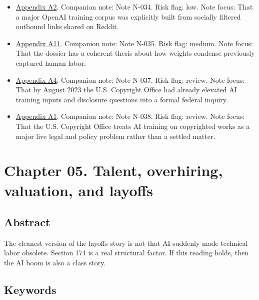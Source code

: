 \documentclass[
  american,
  11pt,
  letterpaper,
]{article}
\begin{document}
\begin{itemize}
  enough to survive dismissal.
\item
  \hyperref[ch-04-appendix-a2-language-models-are-unsupervised-multitask-learners]{Appendix
  A2}. Companion note: Note N-034. Risk flag: low. Note focus: That a
  major OpenAI training corpus was explicitly built from socially
  filtered outbound links shared on Reddit.
\item
  \hyperref[ch-04-appendix-a11-ai-copyright-weights-a-new-frontier-in-intellectual-property-law]{Appendix
  A11}. Companion note: Note N-035. Risk flag: medium. Note focus: That
  the dossier has a coherent thesis about how weights condense
  previously captured human labor.
\item
  \hyperref[ch-04-appendix-a4-copyright-and-artificial-intelligence-notice-of-inquiry]{Appendix
  A4}. Companion note: Note N-037. Risk flag: review. Note focus: That
  by August 2023 the U.S. Copyright Office had already elevated AI
  training inputs and disclosure questions into a formal federal
  inquiry.
\item
  \hyperref[ch-04-appendix-a1-copyright-and-artificial-intelligence-part-3-generative-ai-training-pre-publication-version]{Appendix
  A1}. Companion note: Note N-038. Risk flag: review. Note focus: That
  the U.S. Copyright Office treats AI training on copyrighted works as a
  major live legal and policy problem rather than a settled matter.
\end{itemize}

\newpage

\section{Chapter 05. Talent, overhiring, valuation, and
layoffs}\label{chapter-05.-talent-overhiring-valuation-and-layoffs}

\subsection{Abstract}\label{abstract-5}

The cleanest version of the layoffs story is not that AI suddenly made
technical labor obsolete. Section 174 is a real structural factor. If
this reading holds, then the AI boom is also a class story.

\subsection{Keywords}\label{keywords-5}
\end{document}
